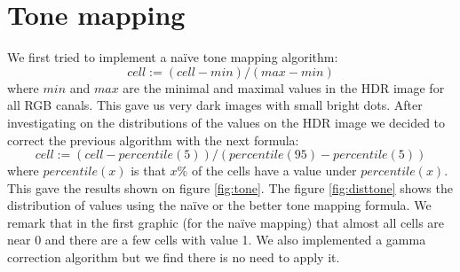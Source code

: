 \documentclass[acmsmall]{acmart}
\begin{document}
\section{Tone mapping}
We first tried to implement a naïve tone mapping algorithm:
\[cell := (cell- min)/(max-min) \] 
where $min$ and $max$ are the minimal and maximal values in the HDR image for all RGB canals.
This gave us very dark images with small bright dots.
After investigating on the distributions of the values on the HDR image we decided to correct the previous algorithm with the next formula:
\[ cell := (cell- percentile(5))/(percentile(95)-percentile(5)) \]
where $percentile(x)$ is that $x$\% of the cells have a value under $percentile(x)$.
This gave the results shown on figure \ref{fig:tone}.
The figure \ref{fig:disttone} shows the distribution of values using the naïve or the better tone mapping formula.
We remark that in the first graphic (for the naïve mapping) that almost all cells are near 0 and there are a few cells with value 1.
We also implemented a gamma correction algorithm but we find there is no need to apply it.
\end{document}
